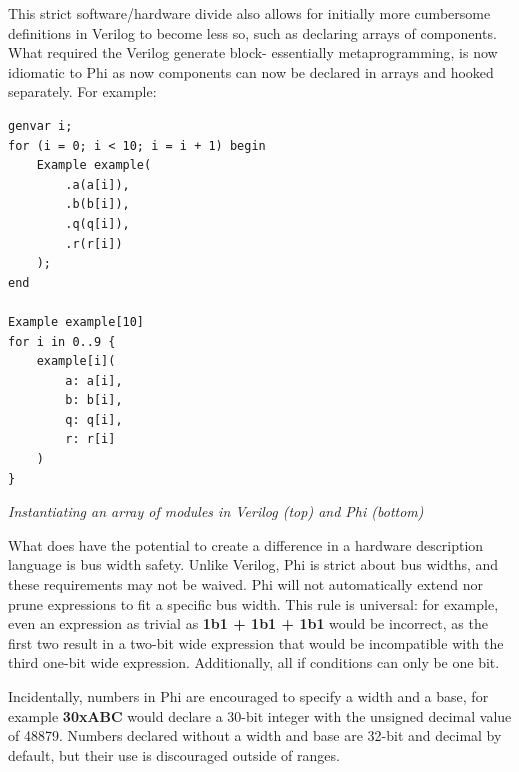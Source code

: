 \documentclass[10pt, two column]{article}
\theoremstyle{definition}
\begin{document}
This strict software/hardware divide also allows for initially more cumbersome definitions in Verilog to become less so, such as declaring arrays of components. What required the Verilog generate block- essentially metaprogramming, is now idiomatic to Phi as now components can now be declared in arrays and hooked separately. For example:\par

\begin{lstlisting}
genvar i;
for (i = 0; i < 10; i = i + 1) begin
    Example example(
        .a(a[i]),
        .b(b[i]),
        .q(q[i]),
        .r(r[i])
    );
end

Example example[10]
for i in 0..9 {
    example[i](
        a: a[i],
        b: b[i],
        q: q[i],
        r: r[i]
    )
}
\end{lstlisting}
\begin{center}
\textit{Instantiating an array of modules in Verilog (top) and Phi (bottom)}
\end{center}

What does have the potential to create a difference in a hardware description language is bus width safety. Unlike Verilog, Phi is strict about bus widths, and these requirements may not be waived. Phi will not automatically extend nor prune expressions to fit a specific bus width. This rule is universal: for example, even an expression as trivial as \textbf{1b1 + 1b1 + 1b1} would be incorrect, as the first two result in a two-bit wide expression that would be incompatible with the third one-bit wide expression. Additionally, all if conditions can only be one bit.

Incidentally, numbers in Phi are encouraged to specify a width and a base, for example \textbf{30xABC} would declare a 30-bit integer with the unsigned decimal value of 48879. Numbers declared without a width and base are 32-bit and decimal by default, but their use is discouraged outside of ranges.\par
\end{document}
